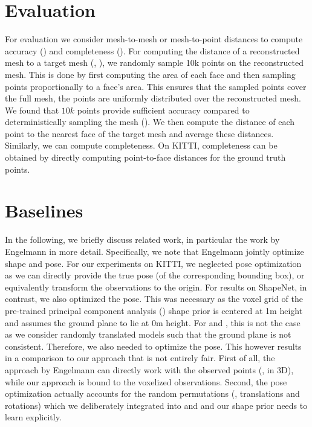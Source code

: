 \documentclass[10pt,letterpaper]{article}
\begin{document}
\section{Evaluation}
\label{sec:appendix-evaluation}

For evaluation we consider mesh-to-mesh or mesh-to-point distances to compute accuracy (\Acc) and completeness (\Compl). For computing the distance of a reconstructed mesh to a target mesh (\ie, \Acc), we randomly sample 10k points on the reconstructed mesh. This is done by first computing the area of each face and then sampling points proportionally to a face's area. This ensures that the sampled points cover the full mesh, \ie the points are uniformly distributed over the reconstructed mesh. We found that $10k$ points provide sufficient accuracy compared to deterministically sampling the mesh (\cf \cite{Jensen2014CVPR}). We then compute the distance of each point to the nearest face of the target mesh and average these distances. Similarly, we can compute completeness. On KITTI, completeness can be obtained by directly computing point-to-face distances for the ground truth points.

\section{Baselines}
\label{sec:appendix-baselines}




In the following, we briefly discuss related work, in particular the work by Engelmann \etal \cite{Engelmann2016GCPR} in more detail. Specifically, we note that Engelmann \etal jointly optimize shape and pose. For our experiments on KITTI, we neglected pose optimization as we can directly provide the true pose (of the corresponding bounding box), or equivalently transform the observations to the origin. For results on ShapeNet, in contrast, we also optimized the pose. This was necessary as the voxel grid of the pre-trained principal component analysis (\PCA) shape prior is centered at 1m height and assumes the ground plane to lie at 0m height. For \clean and \noisy, this is not the case as we consider randomly translated models such that the ground plane is not consistent. Therefore, we also needed to optimize the pose. This however results in a comparison to our approach that is not entirely fair. First of all, the approach by Engelmann \etal can directly work with the observed points (\ie, in 3D), while our approach is bound to the voxelized observations. Second, the pose optimization actually accounts for the random permutations (\ie, translations and rotations) which we deliberately integrated into \clean and \noisy and our shape prior needs to learn explicitly.
\end{document}
